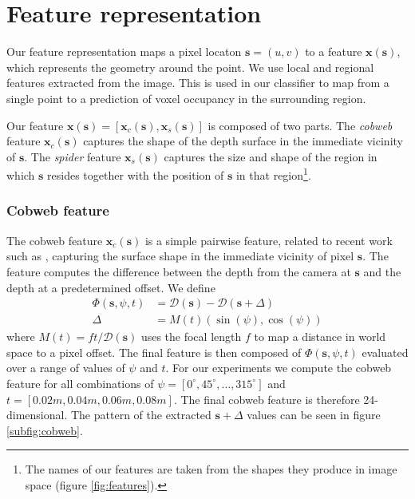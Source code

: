 \documentclass[10pt,twocolumn,letterpaper]{article}
\newcommand{\degree}{^{\circ}}
\newcommand{\rgbdimage}{\mathcal{D}}
\newcommand{\pixelidx}{\mathbf{s}}
\newcommand{\note}[1]{\textcolor{blue}{NOTE: #1}}
\begin{document}
\section{Feature representation}
\newcommand{\feat}{\mathbf{x}}

Our feature representation maps a pixel locaton $\pixelidx = (u, v)$ to a feature $\feat(\pixelidx)$, which represents the geometry around the point.
We use local and regional features extracted from the image.
This is used in our classifier to map from a single point to a prediction of voxel occupancy in the surrounding region.

Our feature $\feat(\pixelidx) = [\feat_c(\pixelidx), \feat_s(\pixelidx)]$ is composed of two parts.
The \emph{cobweb} feature $\feat_c(\pixelidx)$ captures the shape of the depth surface in the immediate vicinity of $\pixelidx$. 
The \emph{spider} feature $\feat_s(\pixelidx)$ captures the size and shape of the region in which $\pixelidx$ resides together with the position of $\pixelidx$ in that region\footnote{The names of our features are taken from the shapes they produce in image space (figure \ref{fig:features}).}.


\subsubsection{Cobweb feature }
The cobweb feature $\feat_c(\pixelidx)$ is a simple pairwise feature, related to recent work such as \cite{shotton-cvpr-2011, tola-pami-2010}, capturing the surface shape in the immediate vicinity of pixel $\pixelidx$.
The feature computes the difference between the depth from the camera at $\pixelidx$ and the depth at a predetermined offset. We define
\begin{align}
\Phi(\pixelidx, \psi, t) &= \rgbdimage(\pixelidx) - \rgbdimage(\pixelidx + \Delta) \\
\Delta &= M(t) (\sin(\psi), \cos(\psi))
\end{align}
where $M(t) = ft / \rgbdimage(\pixelidx)$ uses the focal length $f$ to map a distance in world space to a pixel offset. 
The final feature is then composed of $\Phi(\pixelidx, \psi, t)$ evaluated over a range of values of $\psi$ and $t$.
For our experiments we compute the cobweb feature for all combinations of $\psi = [0\degree, 45\degree, \ldots, 315\degree]$ and $t = [0.02m, 0.04m, 0.06m, 0.08m]$.
The final cobweb feature is therefore 24-dimensional.
The pattern of the extracted $\pixelidx + \Delta$ values can be seen in figure \ref{subfig:cobweb}.
\end{document}
